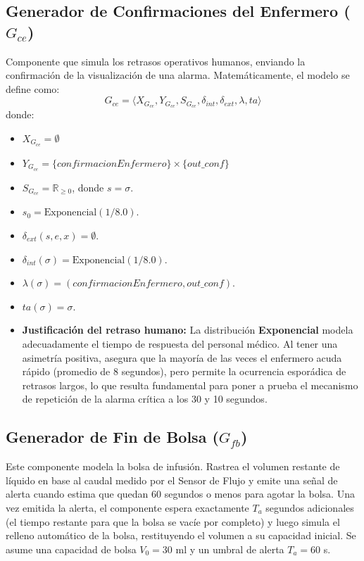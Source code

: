 \subsection{Generador de Confirmaciones del Enfermero ($G_{ce}$)}
Componente que simula los retrasos operativos humanos, enviando la confirmación de la visualización de una alarma.
Matemáticamente, el modelo se define como:
\[ G_{ce} = \langle X_{G_{ce}}, Y_{G_{ce}}, S_{G_{ce}}, \delta_{int}, \delta_{ext}, \lambda, ta \rangle \]
donde:
\begin{itemize}
    \item $X_{G_{ce}} = \emptyset$
    \item $Y_{G_{ce}} = \{confirmacionEnfermero\} \times \{out\_conf\}$
    \item $S_{G_{ce}} = \mathbb{R}_{\geq 0}$, donde $s = \sigma$.
    \item $s_0 = \text{Exponencial}(1 / 8.0)$.
    \item $\delta_{ext}(s, e, x) = \emptyset$.
    \item $\delta_{int}(\sigma) = \text{Exponencial}(1 / 8.0)$.
    \item $\lambda(\sigma) = (confirmacionEnfermero, out\_conf)$.
    \item $ta(\sigma) = \sigma$.
    \item \textbf{Justificación del retraso humano:} La distribución \textbf{Exponencial} modela adecuadamente el tiempo de respuesta del personal médico. Al tener una asimetría positiva, asegura que la mayoría de las veces el enfermero acuda rápido (promedio de 8 segundos), pero permite la ocurrencia esporádica de retrasos largos, lo que resulta fundamental para poner a prueba el mecanismo de repetición de la alarma crítica a los 30 y 10 segundos.
\end{itemize}

\subsection{Generador de Fin de Bolsa ($G_{fb}$)}
Este componente modela la bolsa de infusión. Rastrea el volumen restante de líquido
en base al caudal medido por el Sensor de Flujo y emite una señal de alerta cuando
estima que quedan 60 segundos o menos para agotar la bolsa.
Una vez emitida la alerta, el componente espera exactamente $T_a$ segundos adicionales (el tiempo restante para que la bolsa se vacíe por completo) y luego simula el relleno automático de la bolsa, restituyendo el volumen a su capacidad inicial.
Se asume una capacidad de bolsa $V_0 = 30$ ml y un umbral de alerta $T_a = 60$ s.

